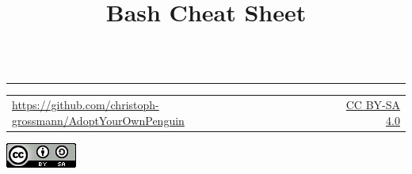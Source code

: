 \documentclass[a4paper, 20pt]{beamer}
\title{Bash Cheat Sheet}
\newcommand\fixboxspacing{\vskip-2.5\baselineskip}
\begin{document}
	\begin{frame}[plain]%
		\titlepage
		\vfill%
		\begin{columns}%
			\begin{column}[t]{0.5\linewidth}%
			\end{column}
			\begin{column}[t]{0.5\linewidth}
			\end{column}
		\end{columns}
		\fixboxspacing
		\vfill
		\begin{center}
			\noindent\color{secondary}\rule{.8\linewidth}{6pt}
		\end{center}
		\begin{center}
			\begin{tabular}{p{.65\linewidth}r}
				\url{https://github.com/christoph-grossmann/AdoptYourOwnPenguin} &
				\href{http://creativecommons.org/licenses/by-sa/4.0/}{CC BY-SA 4.0}
			\end{tabular}
			\includegraphics[height=1\baselineskip]{../../graphics/cc-by-sa.png}
		\end{center}
	\end{frame}
\end{document}
